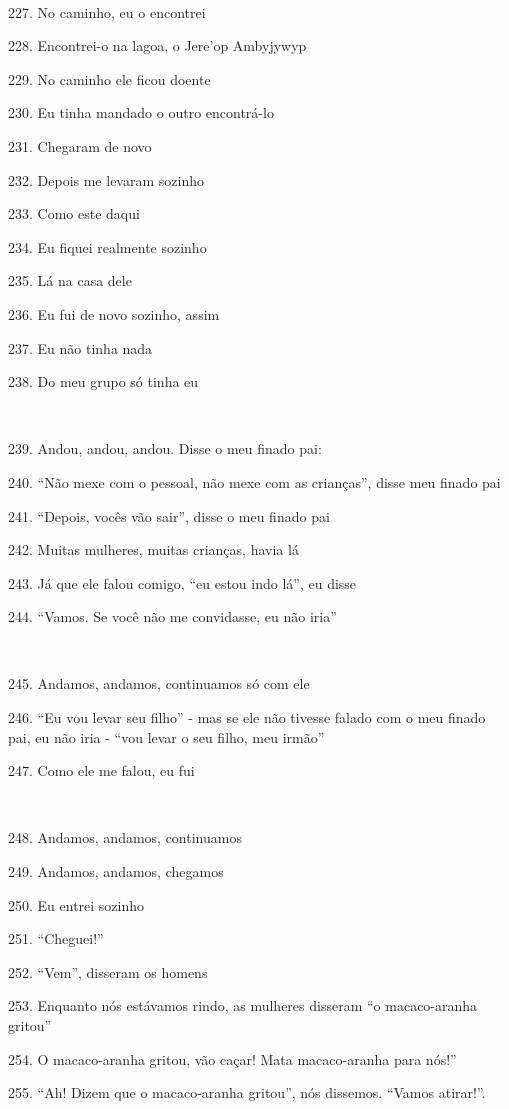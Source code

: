 ~

227. No caminho, eu o encontrei

228. Encontrei-o na lagoa, o Jere'op Ambyjywyp

229. No caminho ele ficou doente

230. Eu tinha mandado o outro encontrá-lo

231. Chegaram de novo

232. Depois me levaram sozinho

233. Como este daqui

234. Eu fiquei realmente sozinho

235. Lá na casa dele

236. Eu fui de novo sozinho, assim

237. Eu não tinha nada

238. Do meu grupo só tinha eu

~

239. Andou, andou, andou. Disse o meu finado pai:

240. ``Não mexe com o pessoal, não mexe com as crianças'', disse meu finado pai

241. ``Depois, vocês vão sair'', disse o meu finado pai

242. Muitas mulheres, muitas crianças, havia lá

243. Já que ele falou comigo, ``eu estou indo lá'', eu disse

244. ``Vamos. Se você não me convidasse, eu não iria''

~

245. Andamos, andamos, continuamos só com ele

246. ``Eu vou levar seu filho'' - mas se ele não tivesse falado com o meu
finado pai, eu não iria - ``vou levar o seu filho, meu irmão''

247. Como ele me falou, eu fui

~

248. Andamos, andamos, continuamos

249. Andamos, andamos, chegamos

250. Eu entrei sozinho

251. ``Cheguei!''

252. ``Vem'', disseram os homens

253. Enquanto nós estávamos rindo, as mulheres disseram ``o macaco-aranha gritou''

254. O macaco-aranha gritou, vão caçar! Mata macaco-aranha para nós!''

255. ``Ah! Dizem que o macaco-aranha gritou'', nós dissemos. ``Vamos atirar!''.


